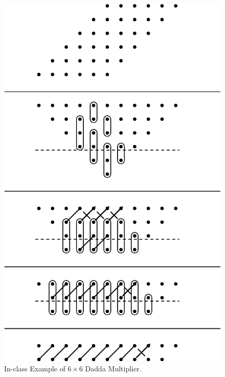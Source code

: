 \documentclass{article}
\begin{document}
  \begin{figure}
    \begin{center}
      \includegraphics[scale=1.0]{dadda6.eps}
    \end{center}
    \label{wallace6.fig}
    \caption{In-class Example of $6 \times 6$ Dadda Multiplier.}
  \end{figure}
\end{document}
